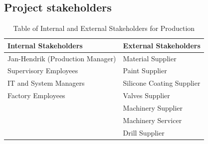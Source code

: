 \documentclass{article}
\begin{document}
  \subsection{Project stakeholders}
  \begin{table}[H]
    \Large
    \centering
    \caption{Table of Internal and External Stakeholders for Production}
  \begin{tabular}{|l|l|}
    \hline
    \textbf{Internal Stakeholders} & \textbf{External Stakeholders}  \\
    \hline
      Jan-Hendrik (Production Manager)    & Material Supplier \\
      Supervisory Employees               & Paint Supplier \\
      IT and System Managers              & Silicone Coating Supplier \\
      Factory Employees                   & Valves Supplier \\
                                          & Machinery Supplier \\
                                          & Machinery Servicer \\
                                          & Drill Supplier \\
      \hline
  \end{tabular}
  \end{table}
\end{document}
